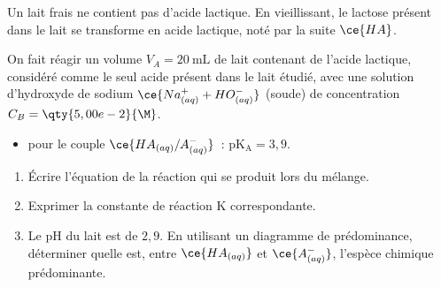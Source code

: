 Un lait frais ne contient pas d'acide lactique. En vieillissant, le lactose
présent dans le lait se transforme en acide lactique, noté par la suite
$\ce{HA}$.

On fait réagir un volume $V_{A}=\qty{20}{\mL}$ de lait contenant de l'acide
lactique, considéré comme le seul acide présent dans le lait étudié, avec une
solution d'hydroxyde de sodium $\ce{Na^+_{(aq)} + HO^-_{(aq)}}$ (soude) de
concentration $C_{B}=\qty{5,00e-2}{\M}$.

\begin{donnees}
    \begin{itemize}
        \item pour le couple $\ce{HA_{(aq)}/A^-_{(aq)}}$~:
              $\mathrm{pK_{A}}=3,9$.
    \end{itemize}
\end{donnees}

\begin{enumerate}
  \item Écrire l'équation de la réaction qui se produit lors du mélange.
  \item Exprimer la constante de réaction $\mathrm{K}$ correspondante.
  \item Le $\mathrm{pH}$ du lait est de $2,9$. En utilisant un diagramme de
        prédominance, déterminer quelle est, entre $\ce{HA_{(aq)}}$ et
        $\ce{A^-_{(aq)}}$, l'espèce chimique prédominante.
\end{enumerate}

